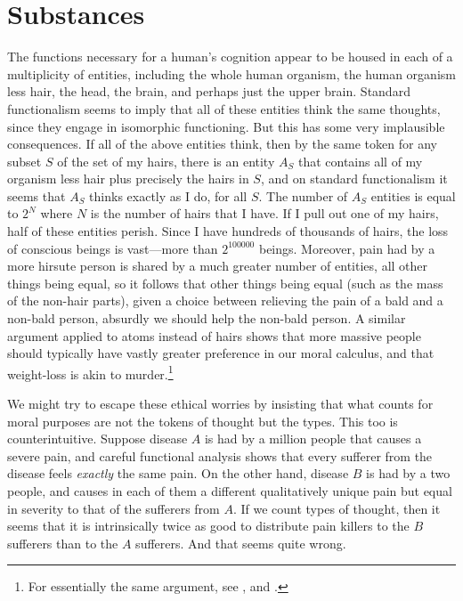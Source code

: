 \section{Substances}
The functions necessary for a human's cognition appear to be housed in each of a multiplicity of entities, including the 
whole human organism, the human organism less hair, the head, the brain, and perhaps just the upper brain. Standard functionalism
seems to imply that all of these entities think the same thoughts, since they engage in isomorphic functioning. But this has some very implausible consequences. If all 
of the above entities think, then by the same token for any subset $S$ of the set of my hairs, there is an entity $A_S$ that 
contains all of my organism less hair plus precisely the hairs in $S$, and on standard functionalism it seems that $A_S$ thinks
exactly as I do, for all $S$. The number of $A_S$ entities is equal to $2^N$ where $N$ is the number of hairs that I have. If I
pull out one of my hairs, half of these entities perish. Since I have hundreds of thousands of hairs, the loss of conscious
beings is vast---more than $2^{100000}$ beings. Moreover, pain had by a more hirsute person is shared by a much 
greater number of entities, all other things being equal, so it follows that other things being equal (such as the mass 
of the non-hair parts), given a choice between relieving the pain of a bald and a non-bald person, absurdly we should help 
the non-bald person. A similar argument applied to atoms instead of hairs shows that more massive people should typically have 
vastly greater preference in our moral calculus, and that weight-loss is akin to murder.\footnote{For essentially
the same argument, see ,  and .}

We might try to escape these ethical worries by insisting that what counts for moral purposes are not the tokens of thought
but the types. This too is counterintuitive. Suppose disease $A$ is had by a million 
people that causes a severe pain, and careful functional analysis shows that every sufferer from the disease feels 
\textit{exactly} the same pain. On the other hand, disease $B$ is had by a two people, and causes in each of them 
a different qualitatively unique pain but equal in severity to that of the sufferers from $A$. If we count types of 
thought, then it seems that it is intrinsically twice as good to distribute pain killers to the $B$ sufferers than to 
the $A$ sufferers. And that seems quite wrong.


